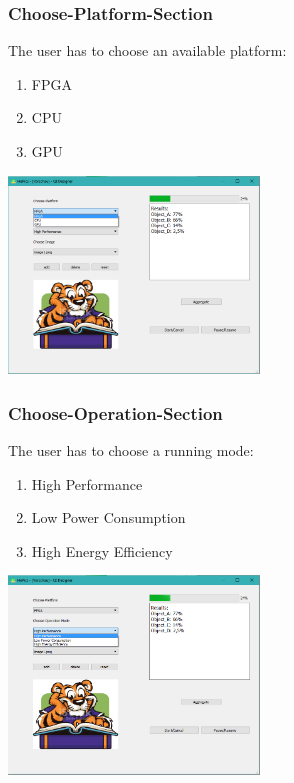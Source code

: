 \documentclass[parskip=full]{scrartcl}
\begin{document}
\pagebreak

\subsubsection {Choose-Platform-Section}

The user has to choose an available platform:

\begin{enumerate}
	\item FPGA
	\item CPU
	\item GPU
\end{enumerate}

\begin{center}
	\includegraphics[width=0.5\textwidth]{images/NewMainWindowPlatform.png}
\end{center}

\subsubsection {Choose-Operation-Section}

 The user has to choose a running mode:

\begin{enumerate}
	\item High Performance
	\item Low Power Consumption
	\item High Energy Efficiency
\end{enumerate}

\begin{center}
\includegraphics[width=0.5\textwidth]{images/NewMainWindowMode.png}
\end{center}
\end{document}
